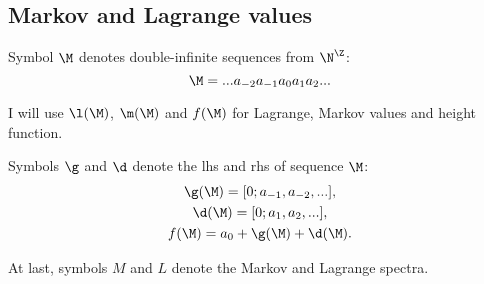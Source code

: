 \subsection{Markov and Lagrange values}
\label{sbsc:introductory}

Symbol $\M$ denotes double-infinite sequences from $\N^\Z$:
\begin{equation*}
	\M = ...a_{-2}a_{-1}a_0a_1a_2...
\end{equation*}

I will use $\l(\M)$, $\m(\M)$ and $f(\M)$ for Lagrange, Markov values and height function.

Symbols $\g$ and $\d$ denote the lhs and rhs of sequence $\M$:
\begin{gather*}
	\g(\M) = [0; a_{-1}, a_{-2}, ...], \\
	\d(\M) = [0; a_1, a_2, ...], \\
	f(\M) = a_0 + \g(\M) + \d(\M).
\end{gather*}

At last, symbols $M$ and $L$ denote the Markov and Lagrange spectra.

